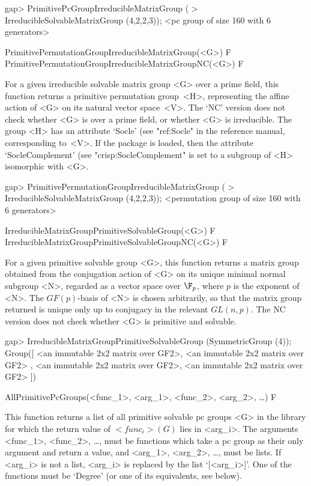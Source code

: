 \beginexample
gap> PrimitivePcGroupIrreducibleMatrixGroup (
>       IrreducibleSolvableMatrixGroup (4,2,2,3));
<pc group of size 160 with 6 generators>
\endexample

\>PrimitivePermutationGroupIrreducibleMatrixGroup(<G>) F
\>PrimitivePermutationGroupIrreducibleMatrixGroupNC(<G>) F

For a given irreducible solvable matrix group <G> over a prime field, this function
returns a primitive permutation group~<H>, representing the affine action of <G> on its natural
vector space~<V>. The `NC' version does not check whether <G> is over a prime field, 
or whether <G> is irreducible. The group <H> has an attribute `Socle' (see "ref:Socle" 
in the {\GAP} reference manual, corresponding to~<V>. If the package {\CRISP} is loaded, 
then the attribute `SocleComplement' (see "crisp:SocleComplement" is set to a subgroup of 
<H> isomorphic with <G>.

\beginexample
gap> PrimitivePermutationGroupIrreducibleMatrixGroup (
>       IrreducibleSolvableMatrixGroup (4,2,2,3));
<permutation group of size 160 with 6 generators>
\endexample

\>IrreducibleMatrixGroupPrimitiveSolvableGroup(<G>) F
\>IrreducibleMatrixGroupPrimitiveSolvableGroupNC(<G>) F

For a given primitive solvable group <G>, this function returns a matrix group 
obtained from the conjugation
action of <G> on its unique minimal normal subgroup <N>, regarded as a vector 
space over $\F_p$, where $p$ is the exponent of <N>. 
The $GF(p)$-basis of <N> is chosen arbitrarily, so that the matrix group returned 
is unique only up to conjugacy in the relevant $GL(n, p)$. The NC version does
not check whether <G> is primitive and solvable.

\beginexample
gap> IrreducibleMatrixGroupPrimitiveSolvableGroup (SymmetricGroup (4));
Group([ <an immutable 2x2 matrix over GF2>, <an immutable 2x2 matrix over GF2>
    , <an immutable 2x2 matrix over GF2>, <an immutable 2x2 matrix over GF2> 
 ])
\endexample


\>AllPrimitivePcGroups(<func_1>, <arg_1>, <func_2>, <arg_2>, \dots) F

This function returns a list of all primitive solvable pc
groups <G> in the  {\IRREDSOL} library for which the return value of $<func_i>(G)$ lies
in <arg_i>.  The arguments <func_1>, <func_2>, \dots,
must be {\GAP} functions which take a pc group as their only argument and return a
value, and <arg_1>, <arg_2>,
\dots,  must be lists. If <arg_i> is not a list, <arg_i> is replaced by the list
`[<arg_i>]'. One of the functions must be `Degree' (or one of its
equivalents, see below).

